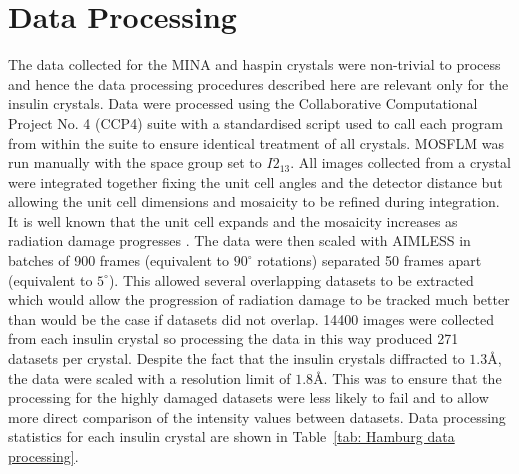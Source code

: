 \section{Data Processing}
The data collected for the MINA and haspin crystals were non-trivial to process and hence the data processing procedures described here are relevant only for the insulin crystals.
Data were processed using the Collaborative Computational Project No. 4 (CCP4) suite \cite{winn2011} with a standardised script used to call each program from within the suite to ensure identical treatment of all crystals.
MOSFLM \cite{leslie2007} was run manually with the space group set to $I2_13$.
All images collected from a crystal were integrated together fixing the unit cell angles and the detector distance but allowing the unit cell dimensions and mosaicity to be refined during integration.
It is well known that the unit cell expands and the mosaicity increases as radiation damage progresses \cite{garman2010}.
The data were then scaled with AIMLESS \cite{evans2013} in batches of 900 frames (equivalent to $90^{\circ}$ rotations) separated 50 frames apart (equivalent to $5^{\circ}$).
This allowed several overlapping datasets to be extracted which would allow the progression of radiation damage to be tracked much better than would be the case if datasets did not overlap.
14400 images were collected from each insulin crystal so processing the data in this way produced 271 datasets per crystal.
Despite the fact that the insulin crystals diffracted to $1.3$\AA, the data were scaled with a resolution limit of $1.8$\AA.
This was to ensure that the processing for the highly damaged datasets were less likely to fail and to allow more direct comparison of the intensity values between datasets.
Data processing statistics for each insulin crystal are shown in Table~\ref{tab: Hamburg data processing}.

